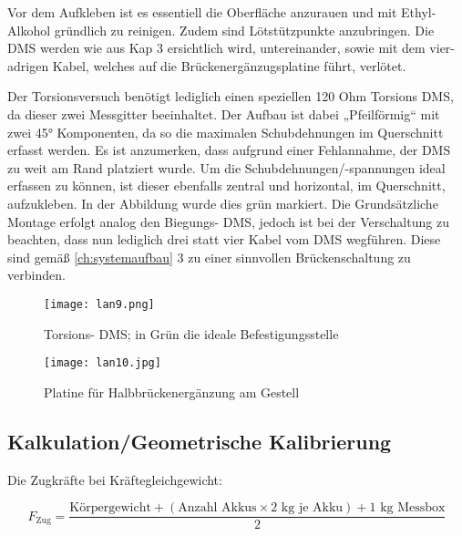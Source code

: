 Vor dem Aufkleben ist es essentiell die Oberfläche anzurauen und mit Ethyl- Alkohol gründlich zu reinigen. Zudem sind Lötstützpunkte anzubringen.
Die DMS werden wie aus Kap 3 ersichtlich wird, untereinander, sowie mit dem vier- adrigen Kabel, welches auf die Brückenergänzugsplatine führt, verlötet. 


Der Torsionsversuch benötigt lediglich einen speziellen 120 Ohm Torsions DMS, da dieser zwei Messgitter beeinhaltet.
Der Aufbau ist dabei „Pfeilförmig“ mit zwei 45° Komponenten, da so die maximalen Schubdehnungen im Querschnitt erfasst werden.
Es ist anzumerken, dass aufgrund einer Fehlannahme, der DMS zu weit am Rand platziert wurde.
Um die Schubdehnungen/-spannungen ideal erfassen zu können, ist dieser ebenfalls zentral und horizontal, im Querschnitt, aufzukleben.
In der Abbildung wurde dies grün markiert. Die Grundsätzliche Montage erfolgt analog den Biegungs- DMS, jedoch ist bei der Verschaltung zu beachten,
dass nun lediglich drei statt vier Kabel vom DMS wegführen. Diese sind gemäß \ref{ch:systemaufbau} 3 zu einer sinnvollen Brückenschaltung zu verbinden.  

\begin{figure}[htbp]
    \centering
    \begin{minipage}{0.48\textwidth}
        \centering
        \texttt{[image: lan9.png]}
        \caption[Torsions- DMS; in Grün die ideale Befestigungsstelle (Abbildungsverzeichnis)]{Torsions- DMS; in Grün die ideale Befestigungsstelle}
        
        \label{fig:lan9}
    \end{minipage}
    \hfill
    \begin{minipage}{0.48\textwidth}
        \centering
        \texttt{[image: lan10.jpg]}
        \caption[Platine für Halbbrückenergänzung am Gestell (Abbildungsverzeichnis)]{Platine für Halbbrückenergänzung am Gestell}
        
        \label{fig:lan10}
    \end{minipage}
\end{figure}

\clearpage
\subsection{Kalkulation/Geometrische Kalibrierung}
\label{sec:geo}
Die Zugkräfte bei Kräftegleichgewicht:

\begin{equation}
F_{\text{Zug}} = \frac{\text{Körpergewicht} + (\text{Anzahl Akkus} \times 2 \text{ kg je Akku}) + 1 \text{ kg Messbox}}{2}
\end{equation}

